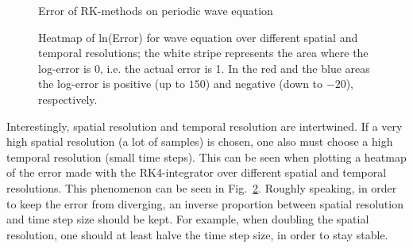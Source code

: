 \begin{figure}[!h]
    \caption{Error of RK-methods on periodic wave equation}
    \label{fig:wave_order_line}
\end{figure}
\begin{figure}[!h]
    \caption{Heatmap of ln(Error) for wave equation over different spatial and temporal resolutions;
    the white stripe represents the area where the log-error is 0, i.e. the actual error is 1.
In the red and the blue areas the log-error is positive (up to $150$) and negative (down to $-20$), respectively.}
    \label{fig:heatmap_wave_eq_step_size_numgridpoints}

\end{figure}


Interestingly, spatial resolution and temporal resolution are intertwined.
If a very high spatial resolution (a lot of samples) is chosen, one also must choose a high temporal resolution (small time steps).
This can be seen when plotting a heatmap of the error made with the RK4-integrator over different spatial and temporal resolutions.
This phenomenon can be seen in Fig.~\ref{fig:heatmap_wave_eq_step_size_numgridpoints}.
Roughly speaking, in order to keep the error from diverging, an inverse proportion between spatial resolution and time step size should be kept.
For example, when doubling the spatial resolution, one should at least halve the time step size, in order to stay stable.


